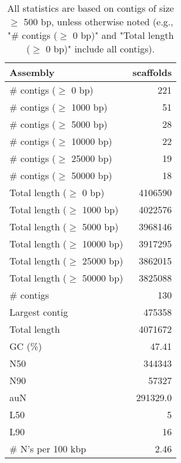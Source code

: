 \documentclass[12pt,a4paper]{article}
\begin{document}
\begin{table}[ht]
\begin{center}
\caption{All statistics are based on contigs of size $\geq$ 500 bp, unless otherwise noted (e.g., "\# contigs ($\geq$ 0 bp)" and "Total length ($\geq$ 0 bp)" include all contigs).}
\begin{tabular}{|l*{1}{|r}|}
\hline
Assembly & scaffolds \\ \hline
\# contigs ($\geq$ 0 bp) & 221 \\ \hline
\# contigs ($\geq$ 1000 bp) & 51 \\ \hline
\# contigs ($\geq$ 5000 bp) & 28 \\ \hline
\# contigs ($\geq$ 10000 bp) & 22 \\ \hline
\# contigs ($\geq$ 25000 bp) & 19 \\ \hline
\# contigs ($\geq$ 50000 bp) & 18 \\ \hline
Total length ($\geq$ 0 bp) & 4106590 \\ \hline
Total length ($\geq$ 1000 bp) & 4022576 \\ \hline
Total length ($\geq$ 5000 bp) & 3968146 \\ \hline
Total length ($\geq$ 10000 bp) & 3917295 \\ \hline
Total length ($\geq$ 25000 bp) & 3862015 \\ \hline
Total length ($\geq$ 50000 bp) & 3825088 \\ \hline
\# contigs & 130 \\ \hline
Largest contig & 475358 \\ \hline
Total length & 4071672 \\ \hline
GC (\%) & 47.41 \\ \hline
N50 & 344343 \\ \hline
N90 & 57327 \\ \hline
auN & 291329.0 \\ \hline
L50 & 5 \\ \hline
L90 & 16 \\ \hline
\# N's per 100 kbp & 2.46 \\ \hline
\end{tabular}
\end{center}
\end{table}
\end{document}
